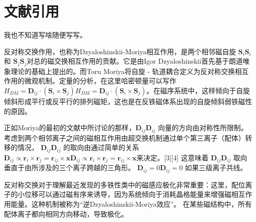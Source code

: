 \documentclass[UTF8,a4paper,10pt,twocolumn]{article}
\begin{document}
	\section{文献引用}
	我也不知道写啥随便写写。
	
	
	反对称交换作用，也称为Dzyaloshinskii-Moriya相互作用，是两个相邻磁自旋 ${  \mathbf {S} _{i}}{  \mathbf {S} _{i}}$和 ${  \mathbf {S} _{j}}{  \mathbf {S} _{j}}$对总的磁交换相互作用的贡献。它是由Igor Dzyaloshinskii首先基于朗道唯象理论的基础上提出的。而Toru Moriya将自旋 - 轨道耦合定义为反对称交换相互作用的微观机制。定量的分析，在这里哈密顿量可以写作${  H_{DM}=\mathbf {D} _{ij}\cdot (\mathbf {S} _{i}\times \mathbf {S} _{j})}{  H_{DM}=\mathbf {D} _{ij}\cdot (\mathbf {S} _{i}\times \mathbf {S} _{j})}$。在磁序系统中，这样倾向于自旋倾斜形成平行或反平行的排列磁矩，这也是在反铁磁体系出现的自旋倾斜弱铁磁性的原因。
	
	正如Moriya的最初的文献中所讨论的那样\cite{moriya1960anisotropic}，${  \mathbf {D} _{ij}}{  \mathbf {D} _{ij}}$ 向量的方向由对称性所限制。 考虑到两个相邻离子之间的磁相互作用由超交换机制通过单个第三离子（配体）转移的情况， ${  \mathbf {D} _{ij}}{  \mathbf {D} _{ij}}$ 的取向由通过简单的关系 ${  \mathbf {D} _{ij}\propto \mathbf {r} _{i}\times \mathbf {r} _{j}=\mathbf {r} _{ij}\times \mathbf {x} }{  \mathbf {D} _{ij}\propto \mathbf {r} _{i}\times \mathbf {r} _{j}=\mathbf {r} _{ij}\times \mathbf {x} }$来决定。[3][4] 这意味着 ${  \mathbf {D} _{ij}}{  \mathbf {D} _{ij}}$ 取向垂直于由所涉及的三个离子跨越的三角形。 ${  \mathbf {D} _{ij}=0}{  \mathbf {D} _{ij}=0}$ 如果三级离子共线。
	
	反对称交换对于理解最近发现的多铁性类中的磁感应极化非常重要：这里，配位离子的小位移可以通过磁有序来诱导，因为系统倾向于消耗晶格能量来增强磁相互作用能量。这种机制被称为“逆Dzyaloshinskii-Moriya效应”。 在某些磁结构中，所有配体离子都向相同方向移动，导致极化。
	

 
\end{document}
